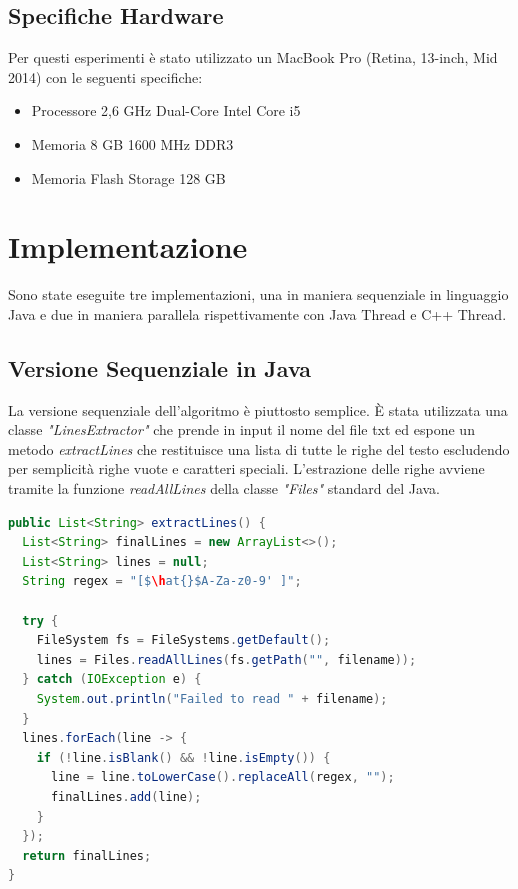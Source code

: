 \documentclass[10pt,twocolumn,letterpaper]{article}
\begin{document}
\subsection{Specifiche Hardware}
Per questi esperimenti è stato utilizzato un MacBook Pro (Retina, 13-inch, Mid 2014) con le seguenti specifiche:
\begin{itemize}
	\item Processore 2,6 GHz Dual-Core Intel Core i5
	\item Memoria 8 GB 1600 MHz DDR3
	\item Memoria Flash Storage 128 GB
\end{itemize}

\section{Implementazione}
Sono state eseguite tre implementazioni, una in maniera sequenziale in linguaggio Java e due in maniera parallela rispettivamente con Java Thread e C++ Thread.

\subsection{Versione Sequenziale in Java}
La versione sequenziale dell'algoritmo è piuttosto semplice. È stata utilizzata una classe \textit{"LinesExtractor"} che prende in input il nome del file txt ed espone un metodo \textit{extractLines} che restituisce una lista di tutte le righe del testo escludendo per semplicità righe vuote e caratteri speciali. L'estrazione delle righe avviene tramite la funzione \textit{readAllLines} della classe \textit{"Files"} standard del Java. 
\begin{lstlisting}[basicstyle=\scriptsize, language=Java, frame=single, caption={Esempio di estrazione di righe da un file in Java},captionpos=b, showstringspaces=false, mathescape=true]
public List<String> extractLines() {
  List<String> finalLines = new ArrayList<>();
  List<String> lines = null;
  String regex = "[$\hat{}$A-Za-z0-9' ]";

  try {
    FileSystem fs = FileSystems.getDefault();
    lines = Files.readAllLines(fs.getPath("", filename));
  } catch (IOException e) {
    System.out.println("Failed to read " + filename);
  }
  lines.forEach(line -> {
    if (!line.isBlank() && !line.isEmpty()) {
      line = line.toLowerCase().replaceAll(regex, "");
      finalLines.add(line);
    }
  });
  return finalLines;
}  
\end{lstlisting}
\end{document}
